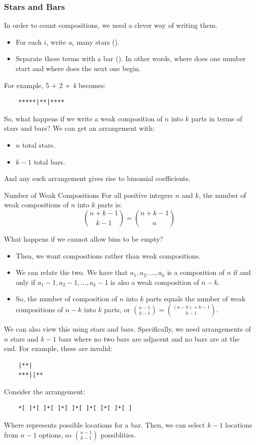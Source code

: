 \documentclass[letterpaper]{article}
\begin{document}
\subsubsection{Stars and Bars}
In order to count compositions, we need a clever way of writing them. 
\begin{itemize}
    \item For each $i$, write $a_i$ many stars (\code{*}). 
    \item Separate these terms with a bar (\code{|}). In other words, where does one number start and where does the next one begin.
\end{itemize}
For example, 5 + 2 + 4 becomes:
\begin{verbatim}
    *****|**|****
\end{verbatim}
So, what happens if we write a weak composition of $n$ into $k$ parts in terms of stars and bars? We can get an arrangement with:
\begin{itemize}
    \item $n$ total stars.
    \item $k - 1$ total bars. 
\end{itemize}
And any such arrangement gives rise to binomial coefficients. 

\begin{theorem}{Number of Weak Compositions}{}
    For all positive integers $n$ and $k$, the number of weak compositions of $n$ into $k$ parts is:
    \[\binom{n + k - 1}{k - 1} = \binom{n + k - 1}{n}\]
\end{theorem}

What happens if we cannot allow bins to be empty? 
\begin{itemize}
    \item Then, we want compositions rather than weak compositions.
    \item We can relate the two. We have that $a_1, a_2, \dots, a_k$ is a composition of $n$ if and only if $a_1 - 1, a_2 - 1, \dots, a_k - 1$ is also a weak composition of $n - k$. 
    \item So, the number of composition of $n$ into $k$ parts equals the number of weak compositions of $n - k$ into $k$ parts, or $\binom{n - 1}{k - 1} = \binom{(n - k) + k - 1}{k - 1}$. 
\end{itemize}
We can also view this using stars and bars. Specifically, we need arrangements of $n$ stars and $k - 1$ bars where no two bars are adjacent and no bars are at the end. For example, these are invalid:
\begin{verbatim}
    |**|
    ***||**
\end{verbatim}
Consider the arrangement:
\begin{verbatim}
    *[ ]*[ ]*[ ]*[ ]*[ ]*[ ]*[ ]*[ ]
\end{verbatim}
Where \code{[ ]} represents possible locations for a bar. Then, we can select $k - 1$ locations from $n - 1$ options, so $\binom{n - 1}{k - 1}$ possiblities. 
\end{document}
